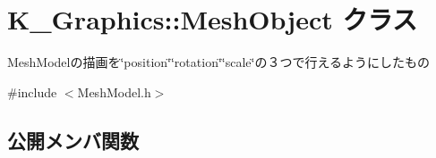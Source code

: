 \hypertarget{class_k___graphics_1_1_mesh_object}{}\section{K\+\_\+\+Graphics\+:\+:Mesh\+Object クラス}
\label{class_k___graphics_1_1_mesh_object}


Mesh\+Modelの描画を\char`\"{}position\char`\"{}\char`\"{}rotation\char`\"{}\char`\"{}scale\char`\"{}の３つで行えるようにしたもの  




{\ttfamily \#include $<$Mesh\+Model.\+h$>$}

\subsection*{公開メンバ関数}
